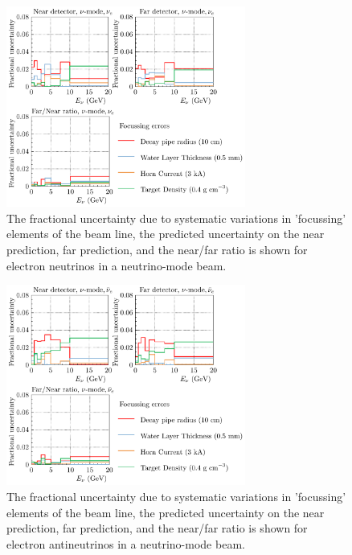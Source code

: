 \documentclass{article}
\begin{document}
\begin{figure}
  \centering
  \includegraphics[width=0.7\textwidth]{plots/fracerrs/numode_nue_Focussing}
  \caption{The fractional uncertainty due to systematic variations in 'focussing' elements of the beam line, the predicted uncertainty on the near prediction, far prediction, and the near/far ratio is shown for electron neutrinos in a neutrino-mode beam.}
  \label{fig:foc_nu_nue}
\end{figure}

\begin{figure}
  \centering
  \includegraphics[width=0.7\textwidth]{plots/fracerrs/numode_nuebar_Focussing}
  \caption{The fractional uncertainty due to systematic variations in 'focussing' elements of the beam line, the predicted uncertainty on the near prediction, far prediction, and the near/far ratio is shown for electron antineutrinos in a neutrino-mode beam.}
  \label{fig:foc_nu_nuebar}
\end{figure}
\end{document}
